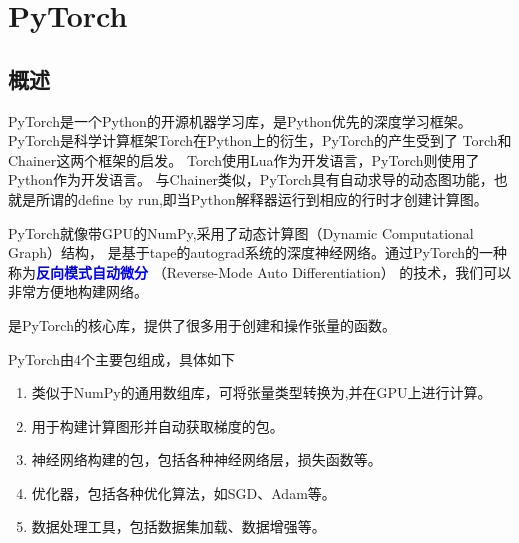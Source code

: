 \chapter{PyTorch}
\section{概述}
PyTorch是一个Python的开源机器学习库，是Python优先的深度学习框架。
PyTorch是科学计算框架Torch在Python上的衍生，PyTorch的产生受到了 Torch和Chainer这两个框架的启发。
Torch使用Lua作为开发语言，PyTorch则使用了 Python作为开发语言。 
与Chainer类似，PyTorch具有自动求导的动态图功能，也就是所谓的define by run,即当Python解释器运行到相应的行时才创建计算图。

PyTorch就像带GPU的NumPy,采用了动态计算图（Dynamic Computational Graph）结构，
是基于tape的autograd系统的深度神经网络。通过PyTorch的一种称为\textcolor{blue}{\textbf{反向模式自动微分}}
（Reverse-Mode Auto Differentiation） 的技术，我们可以非常方便地构建网络。

是PyTorch的核心库，提供了很多用于创建和操作张量的函数。

PyTorch由4个主要包组成，具体如下
\begin{enumerate}[label=\arabic*)]
    \item {}
    类似于NumPy的通用数组库，可将张量类型转换为,并在GPU上进行计算。

    \item {}
    用于构建计算图形并自动获取梯度的包。
    
    \item {}
    神经网络构建的包，包括各种神经网络层，损失函数等。

    \item {}
    优化器，包括各种优化算法，如SGD、Adam等。

    \item {}
    数据处理工具，包括数据集加载、数据增强等。
\end{enumerate}

